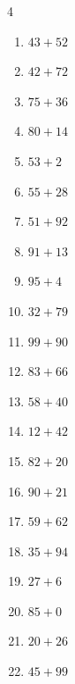 \begin{multicols}{4}
\begin{enumerate}
  \item $43+52$
        \phantom{$=95$}

  \item $42+72$
        \phantom{$=114$}

  \item $75+36$
        \phantom{$=111$}

  \item $80+14$
        \phantom{$=94$}

  \item $53+2$
        \phantom{$=55$}

  \item $55+28$
        \phantom{$=83$}

  \item $51+92$
        \phantom{$=143$}

  \item $91+13$
        \phantom{$=104$}

  \item $95+4$
        \phantom{$=99$}

  \item $32+79$
        \phantom{$=111$}

  \item $99+90$
        \phantom{$=189$}

  \item $83+66$
        \phantom{$=149$}

  \item $58+40$
        \phantom{$=98$}

  \item $12+42$
        \phantom{$=54$}

  \item $82+20$
        \phantom{$=102$}

  \item $90+21$
        \phantom{$=111$}

  \item $59+62$
        \phantom{$=121$}

  \item $35+94$
        \phantom{$=129$}

  \item $27+6$
        \phantom{$=33$}

  \item $85+0$
        \phantom{$=85$}

  \item $20+26$
        \phantom{$=46$}

  \item $45+99$
        \phantom{$=144$}


\end{enumerate}
\end{multicols}
